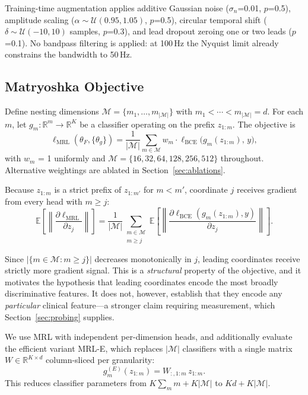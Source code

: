 Training-time augmentation applies additive Gaussian noise
($\sigma_n$=0.01, $p$=0.5), amplitude scaling ($\alpha \sim
\mathcal{U}(0.95,1.05)$, $p$=0.5), circular temporal shift ($\delta \sim
\mathcal{U}(-10,10)$ samples, $p$=0.3), and lead dropout zeroing one or two
leads ($p$=0.1). No bandpass filtering is applied: at 100\,Hz the Nyquist
limit already constrains the bandwidth to 50\,Hz.

\subsection{Matryoshka Objective}

Define nesting dimensions $\mathcal{M} = \{m_1,\dots,m_{|\mathcal{M}|}\}$ with
$m_1 < \cdots < m_{|\mathcal{M}|} = d$. For each $m$, let $g_m:\mathbb{R}^m
\to \mathbb{R}^K$ be a classifier operating on the prefix $z_{1:m}$. The
objective is
\begin{equation}
\ell_{\mathrm{MRL}}(\theta_F, \{\theta_g\}) =
\frac{1}{|\mathcal{M}|}\sum_{m \in \mathcal{M}}
w_m \cdot \ell_{\mathrm{BCE}}\big(g_m(z_{1:m}),\, y\big),
\label{eq:mrl}
\end{equation}
with $w_m$ = 1 uniformly and $\mathcal{M} = \{16,32,64,128,256,512\}$
throughout. Alternative weightings are ablated in
Section~\ref{sec:ablations}.

Because $z_{1:m}$ is a strict prefix of $z_{1:m'}$ for $m<m'$, coordinate $j$
receives gradient from every head with $m \ge j$:
\begin{equation}
\mathbb{E}\!\left[\left\|\frac{\partial \ell_{\mathrm{MRL}}}{\partial z_j}\right\|\right]
= \frac{1}{|\mathcal{M}|}\!\!\sum_{\substack{m \in \mathcal{M} \\ m \ge j}}\!\!
\mathbb{E}\!\left[\left\|\frac{\partial \ell_{\mathrm{BCE}}(g_m(z_{1:m}),y)}{\partial z_j}\right\|\right]\!.
\label{eq:gradpressure}
\end{equation}

Since $|\{m \in \mathcal{M}: m \ge j\}|$ decreases monotonically in $j$,
leading coordinates receive strictly more gradient signal. This is a
\emph{structural} property of the objective, and it motivates the hypothesis
that leading coordinates encode the most broadly discriminative features. It
does not, however, establish that they encode any \emph{particular} clinical
feature---a stronger claim requiring measurement, which
Section~\ref{sec:probing} supplies.

We use MRL with independent per-dimension heads, and additionally evaluate the
efficient variant MRL-E, which replaces $|\mathcal{M}|$ classifiers with a
single matrix $W \in \mathbb{R}^{K \times d}$ column-sliced per granularity:
\begin{equation}
g^{(E)}_m(z_{1:m}) = W_{:,1:m}\, z_{1:m}.
\label{eq:mrle}
\end{equation}
This reduces classifier parameters from $K\sum_m m + K|\mathcal{M}|$ to
$K d + K|\mathcal{M}|$.

